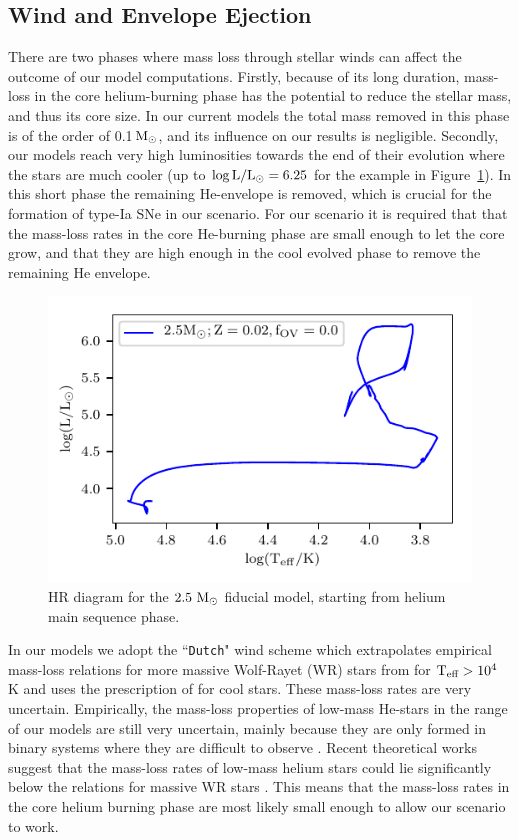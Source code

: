 \documentclass[../../main/thesis_msc.tex]{subfiles}
\begin{document}
    \subsection{Wind and Envelope Ejection} \label{sec:wind}
There are two phases where mass loss through stellar winds can affect the outcome of our model computations. Firstly, because of its long duration, mass-loss in the core helium-burning phase has the potential to reduce the stellar mass, and thus its core size. In our current models the total mass removed in this phase is of the order of 0.1\,$\rm M_\odot$, and its influence on our results is negligible. Secondly, our models reach very high luminosities towards the end of their evolution where the stars are much cooler (up to $\rm \log{L/L_\odot = 6.25}$ for the example in Figure\, \ref{fig:HRD}). In this short phase the remaining He-envelope is removed, which is crucial for the formation of type-Ia SNe in our scenario. For our scenario it is required that that the mass-loss rates in the core He-burning phase are small enough to let the core grow, and that they are high enough in the cool evolved phase to remove the remaining He envelope.

    \begin{figure}[h!]
        \centering
        \includegraphics[width=0.6\columnwidth]{../figures/chapter4/HRD.pdf}
        \caption{HR diagram for the $\rm 2.5 \ M_{\odot}$ fiducial model, starting from helium main sequence phase.}
        \label{fig:HRD}
    \end{figure}


In our models we adopt the ``\texttt{Dutch}" \mesa wind scheme which extrapolates empirical mass-loss relations for more massive Wolf-Rayet (WR) stars from \cite{Nugis2000} for $\rm T_{\text{eff}} > 10^4$ K and uses the prescription of \cite{deJager1988} for cool stars. These mass-loss rates are very uncertain. Empirically, the mass-loss properties of low-mass He-stars in the range of our models are still very uncertain, mainly because they are only formed in binary systems where they are difficult to observe \citep{Smith2017,Zapartas2017}. Recent theoretical works suggest that the mass-loss rates of low-mass helium stars could lie significantly below the relations for massive WR stars \citep{Graefener2017,Vink2017}. This means that the mass-loss rates in the core helium burning phase are most likely small enough to allow our scenario to work.
        
\end{document}
